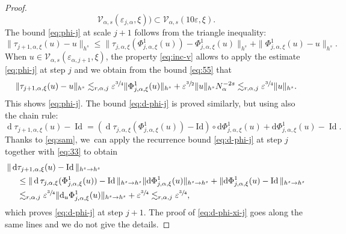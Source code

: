 \documentclass[JEP,XML,SOM,Unicode,published]{cedram}
\theoremstyle{plain}
\theoremstyle{definition}
\newcommand{\1}{\mathbf{1}}
\let\epsilon\varepsilon
\begin{document}
\begin{proof}
\begin{equation}
\mathcal{V}_{\alpha,s}(\epsilon_{j,\alpha}, \xi)
)
\subset \mathcal{V}_{\alpha,s}(10\epsilon,\xi).
\end{equation}
The bound \eqref{eq:phi-j} at scale $j+1$ follows from the triangle inequality:\[
\|\tau_{j+1,\alpha,\xi}(u)
-u\|_{h^{s}}
\leq
\|\tau_{j,\alpha,\xi}(\Phi_{j,\alpha,\xi}^{1}(u)) - \Phi_{j,\alpha,\xi}^{1}(u)\|_{h^{s}}
+
\|\Phi_{j,\alpha,\xi}^{1}(u)
- u\|_{h^{s}}.
\]
When $u\in\mathcal{V}_{\alpha,s}(\epsilon_{\alpha,j+1},\xi)$,
the property \eqref{eq:inc-v} allows to apply the estimate \eqref{eq:phi-j} at step $j$ and we obtain from the bound \eqref{eq:55} that
\[
\|\tau_{j+1,\alpha,\xi}(u)
-u\|_{h^{s}}
\lesssim_{r,\alpha,j}\epsilon^{\sfrac{3}{4}}\|\Phi_{j,\alpha,\xi}^{1}(u)\|_{h^{s}}
+
\epsilon^{\sfrac{3}{2}}\|u\|_{h^{s}}N_{\alpha}^{-2s}
\lesssim_{r,\alpha,j}
\epsilon^{\sfrac{3}{4}}\|u\|_{h^{s}}.
\]
This shows \eqref{eq:phi-j}. The bound \eqref{eq:d-phi-j} is proved similarly, but using also the chain rule:
\[
\operatorname{d}\tau_{j+1,\alpha,\xi}(u) - \operatorname{Id}
= (\operatorname{d}\tau_{j,\alpha,\xi}(\Phi_{j,\alpha,\xi}^{1}(u))-\mathrm{Id})
\circ
\mathrm{d}\Phi_{j,\alpha,\xi}^{1}(u)
+
\mathrm{d}
\Phi_{j,\alpha,\xi}^{1}(u)
- \operatorname{Id}.
\]
Thanks to \eqref{eq:sam}, we~can apply the recurrence bound \eqref{eq:d-phi-j} at step $j$ together with \eqref{eq:33} to obtain
\begin{align*}
\|
\operatorname{d}&\tau_{j+1,\alpha,\xi}(u) - \operatorname{Id}
\|_{h^{s}\to h^{s}} \\
&\leq
\|
\operatorname{d}\tau_{j,\alpha,\xi}(\Phi_{j,\alpha,\xi}^{1}(u)) - \operatorname{Id}
\|_{h^{s}\to h^{s}}
\|
\mathrm{d}\Phi_{j,\alpha,\xi}^{1}(u)
\|_{h^{s}\to h^{s}}
+
\|
\mathrm{d}\Phi_{j,\alpha,\xi}^{1}(u)
- \operatorname{Id}
\|_{h^{s}\to h^{s}} \\
&\lesssim_{r,\alpha,j}\epsilon^{\sfrac{3}{4}}\|
\mathrm{d}_{u}\Phi_{j,\alpha,\xi}^{1}(u)
\|_{h^{s}\to h^{s}} + \epsilon^{\sfrac{3}{4}}
\lesssim_{r,\alpha,j}
\epsilon^{\sfrac{3}{4}},
\end{align*}
which proves \eqref{eq:d-phi-j} at step $j+1$. The proof of \eqref{eq:d-phi-xi-j} goes along the same lines and we do not give the details.


\end{proof}
\end{document}
